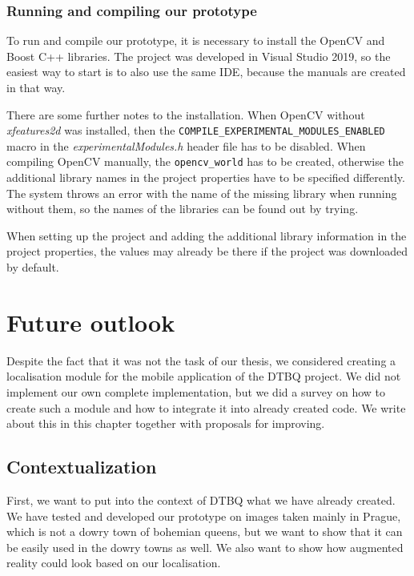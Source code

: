 \documentclass[thesis=B,english]{FITthesis}[2019/12/23]
\begin{document}
        \subsection{Running and compiling our prototype}
                To run and compile our prototype, it is necessary to install the OpenCV and Boost C++ libraries. The project was developed in Visual Studio 2019, so the easiest way to start is to also use the same IDE, because the manuals are created in that way.
                
                There are some further notes to the installation. When OpenCV without \textit{xfeatures2d} was installed, then the \texttt{COMPILE\_EXPERIMENTAL\_MODULES\_ENABLED} macro in the \textit{experimentalModules.h} header file has to be disabled. When compiling OpenCV manually, the \texttt{opencv\_world} has to be created, otherwise the additional library names in the project properties have to be specified differently. The system throws an error with the name of the missing library when running without them, so the names of the libraries can be found out by trying.
                
                When setting up the project and adding the additional library information in the project properties, the values may already be there if the project was downloaded by default.
                
    
    
\chapter{Future outlook}
    Despite the fact that it was not the task of our thesis, we considered creating a localisation module for the mobile application of the DTBQ project. We did not implement our own complete implementation, but we did a survey on how to create such a module and how to integrate it into already created code. We write about this in this chapter together with proposals for improving.
    
    \section{Contextualization}
        First, we want to put into the context of DTBQ what we have already created. We have tested and developed our prototype on images taken mainly in Prague, which is not a dowry town of bohemian queens, but we want to show that it can be easily used in the dowry towns as well. We also want to show how augmented reality could look based on our localisation.
        
\end{document}
